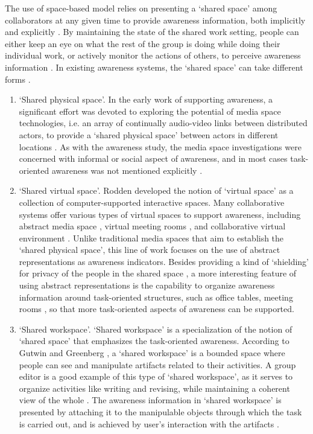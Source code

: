 The use of space-based model relies on presenting a `shared space' among collaborators at any given time to provide awareness information, both implicitly and explicitly \cite{dourish1992awareness}. By maintaining the state of the shared work setting, people can either keep an eye on what the rest of the group is doing while doing their individual work, or actively monitor the actions of others, to perceive awareness information \cite{simone2002a}. 
In existing awareness systems, the `shared space' can take different forms \cite{antunes2010a}. 
\begin{enumerate}
   \item `Shared physical space'. In the early work of supporting awareness, a significant effort was devoted to exploring the potential of media space technologies, i.e. an array of continually audio-video links between distributed actors, to provide a `shared physical space' between actors in different locations \cite{Dourish1992}. As with the awareness study, the media space investigations were concerned with informal or social aspect of awareness, and in most cases task-oriented awareness was not mentioned explicitly \cite{schmidt2002a}.
   \item `Shared virtual space'. Rodden \cite{Rodden1996} developed the notion of `virtual space' as a collection of computer-supported interactive spaces. Many collaborative systems offer various types of virtual spaces to support awareness, including abstract media space \cite{Pedersen1997}, virtual meeting rooms \cite{Berlage1999}, and collaborative virtual environment \cite{Benford2001}. Unlike traditional media spaces that aim to establish the `shared physical space', this line of work focuses on the use of abstract representations as awareness indicators. Besides providing a kind of `shielding' for privacy of the people in the shared space \cite{Pedersen1997}, a more interesting feature of using abstract representations is the capability to organize awareness information around task-oriented structures, such as office tables, meeting rooms \cite{Berlage1999}, so that more task-oriented aspects of awareness can be supported.
   \item `Shared workspace'. `Shared workspace' is a specialization of the notion of `shared space' that emphasizes the task-oriented awareness. According to Gutwin and Greenberg \cite{Gutwin2002}, a `shared workspace' is a bounded space where people can see and manipulate artifacts related to their activities. A group editor is a good example of this type of `shared workspace', as it serves to organize activities like writing and revising, while maintaining a coherent view of the whole \cite{dourish1992awareness}. The awareness information in `shared workspace' is presented by attaching it to the manipulable objects through which the task is carried out, and is achieved by user's interaction with the artifacts \cite{Gutwin2002}.
\end{enumerate}

